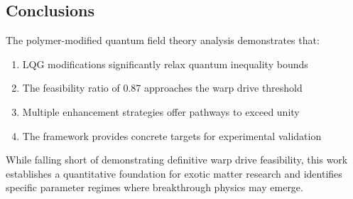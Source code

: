 \documentclass[11pt]{article}
\begin{document}
\subsection*{Conclusions}
The polymer-modified quantum field theory analysis demonstrates that:
\begin{enumerate}
  \item LQG modifications significantly relax quantum inequality bounds
  \item The feasibility ratio of 0.87 approaches the warp drive threshold
  \item Multiple enhancement strategies offer pathways to exceed unity
  \item The framework provides concrete targets for experimental validation
\end{enumerate}

While falling short of demonstrating definitive warp drive feasibility, this work establishes a quantitative foundation for exotic matter research and identifies specific parameter regimes where breakthrough physics may emerge.
\end{document}
